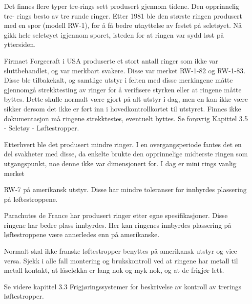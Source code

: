 Det finnes flere typer tre-rings sett produsert gjennom tidene. Den opprinnelig tre- rings besto av tre runde ringer. Etter 1981 ble den største ringen produsert med en spor (modell RW-1), for å få bedre utnyttelse av festet på seletøyet. Nå gikk hele seletøyet igjennom sporet, isteden for at ringen var sydd løst på yttersiden.

Firmaet Forgecraft i USA produserte et stort antall ringer som ikke var sluttbehandlet, og var merkbart svakere. Disse var merket RW-1-82 og RW-1-83. Disse ble tilbakekalt, og samtlige utstyr i felten med disse merkingene måtte gjennomgå strekktesting av ringer for å verifisere styrken eller at ringene måtte byttes. Dette skulle normalt være gjort på alt utstyr i dag, men en kan ikke være sikker dersom det ikke er ført inn i hovedkontrollkortet til utstyret. Finnes ikke dokumentasjon må ringene strekktestes, eventuelt byttes. Se forøvrig Kapittel 3.5 - Seletøy - Løftestropper.

Etterhvert ble det produsert mindre ringer. I en overgangsperiode fantes det en del svakheter med disse, da enkelte brukte den opprinnelige midterste ringen som utgangspunkt, noe denne ikke var dimensjonert for. I dag er mini rings vanlig merket

RW-7 på amerikansk utstyr. Disse har mindre toleranser for innbyrdes plassering på løftestroppene.

Parachutes de France har produsert ringer etter egne spesifikasjoner. Disse ringene har bedre plass innbyrdes. Her kan ringenes innbyrdes plassering på løftestroppene være annerledes enn på amerikanske.

Normalt skal ikke franske løftestropper benyttes på amerikansk utstyr og vice versa. Sjekk i alle fall montering og brukskontroll ved at ringene har metall til metall kontakt, at låseløkka er lang nok og myk nok, og at de frigjør lett.

Se videre kapittel 3.3 Frigjøringssystemer for beskrivelse av kontroll av trerings løftestropper.

